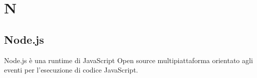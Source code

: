 \section{N}
	\subsection{Node.js} 
		Node.js è una runtime di JavaScript Open source multipiattaforma orientato agli eventi per l'esecuzione di codice JavaScript.


\newpage